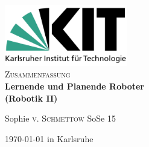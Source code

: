 \documentclass[11pt]{scrartcl}
\begin{document}
\begin{titlepage}

\begin{center}


\includegraphics[width=0.4\textwidth]{Logo_KIT.png}\\[1cm]    



\textsc{\Large Zusammenfassung}\\[0.5cm]


{ \huge \bfseries Lernende und Planende Roboter}\\[0.4cm]
{ \large \bfseries (Robotik II)}
\bigskip


Sophie \textsc{v. Schmettow}
SoSe 15\\



\vfill

{\large \today{} in Karlsruhe} 

\end{center}


\end{titlepage}


\tableofcontents
\newpage


\end{document}
